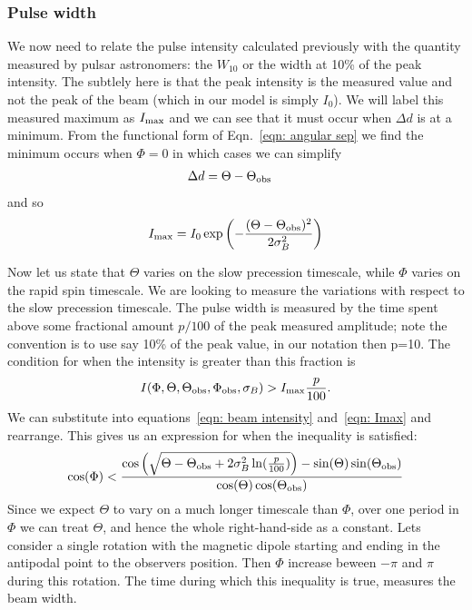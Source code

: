\documentclass[/home/greg/Thesis/main/main.tex]{subfiles}
\begin{document}
\subsubsection{Pulse width}
We now need to relate the pulse intensity calculated previously with the quantity
measured by pulsar astronomers: the $W_{10}$ or the width at 10\% of the peak
intensity. The subtlely here is that the peak intensity is the measured value
and not the peak of the beam (which in our model is simply  $I_0$). We will label
this measured maximum as $I_{\textrm{max}}$ and we can see that it must occur when $\Delta d$
is at a minimum. From the functional form of Eqn.~\eqref{eqn: angular sep} we
find the minimum occurs when $\Phi=0$ in which cases we can simplify
\begin{align}
\Delta d &= \Theta - \Theta_{\mathrm{obs}}
\end{align}
and so
\begin{align}
I_{\textrm{max}} = I_{0} \exp\left(-\frac{(\Theta - \Theta_{\mathrm{obs}})^{2}}{2\sigma_{B}^{2}}\right)
\label{eqn: Imax}
\end{align}

Now let us state that $\Theta$ varies on the slow
precession timescale, while $\Phi$ varies on the rapid spin timescale. We are
looking to measure the variations with respect to the slow precession timescale.
The pulse width is measured by the time spent above some fractional amount $p/100$
of the peak measured amplitude; note the convention is to use say 10\% of the peak
value, in our notation then p=10. The condition for when the intensity is greater
than this fraction is
\begin{align}
I(\Phi, \Theta, \Theta_{\mathrm{obs}}, \Phi_{\mathrm{obs}}, \sigma_{B}) > I_{\textrm{max}} \frac{p}{100}.
\end{align}
We can substitute into equations~\eqref{eqn: beam intensity} and~\eqref{eqn: Imax}
and rearrange. This gives us an expression for when the inequality is satisfied:
\begin{equation}
\cos(\Phi) < \frac{\cos\left(\sqrt{\Theta - \Theta_{\mathrm{obs}} + 2\sigma_{B}^{2} \ln(\frac{p}{100})}\right) - \sin(\Theta)\sin(\Theta_{\mathrm{obs}})}
                          {\cos(\Theta)\cos(\Theta_{\mathrm{obs}})}
\label{eqn: 6737}
\end{equation}
Since we expect $\Theta$ to vary on a much longer timescale than $\Phi$, over 
one period in $\Phi$ we can treat $\Theta$, and hence the whole right-hand-side
as a constant. Lets consider a single rotation with the magnetic dipole
starting and ending in the antipodal point to the observers position. Then
$\Phi$ increase beween $-\pi$ and $\pi$ during this rotation. The
time during which this inequality is true, measures the beam width.
\end{document}
